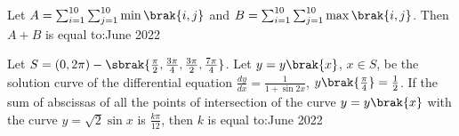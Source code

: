        
        
    \item Let $A=\sum_{i=1}^{10}\sum_{j=1}^{10}\min\brak{i,j}$ and $B=\sum_{i=1}^{10}\sum_{j=1}^{10}\max\brak{i,j}$. Then $A+B$ is equal to:\hfill{June 2022}
    
      
        
    \item Let $S=\left(0,2\pi\right)-\sbrak{\frac{\pi}{2},\frac{3\pi}{4},\frac{3\pi}{2},\frac{7\pi}{4}}$. Let $y=y\brak{x}$, $x\in S$, be the solution curve of the differential equation $\frac{dy}{dx}=\frac{1}{1+\sin 2x}$, $y\brak{\frac{\pi}{4}}=\frac{1}{2}$. If the sum of abscissas of all the points of intersection of the curve $y=y\brak{x}$ with the curve $y=\sqrt{2}\sin x$ is $\frac{k\pi}{12}$, then $k$ is equal to:\hfill{June 2022}

